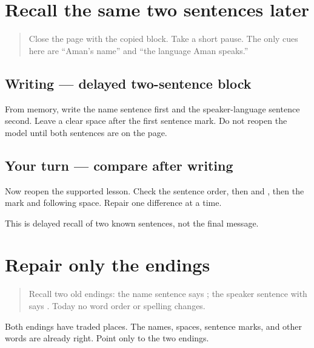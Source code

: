 \section[(delayed name and language pair)]{Recall the same two sentences later}

\label{lesson:PA-W12-two-sentence-delayed}



\begin{quote}
Close the page with the copied block. Take a short pause. The only cues here are “Aman's name” and “the language Aman speaks.”
\end{quote}

\subsection*{Writing — delayed two-sentence block}
From memory, write the name sentence first and the speaker-language sentence second. Leave a clear space after the first sentence mark. Do not reopen the model until both sentences are on the page.

\subsection*{Your turn — compare after writing}
Now reopen the supported lesson. Check the sentence order, then \textbf{} and \textbf{}, then the mark and following space. Repair one difference at a time.

\begin{tcolorbox}[breakable,colback=teal!4,colframe=teal!35!black,title={Before you move on}]
This is delayed recall of two known sentences, not the final message.
\end{tcolorbox}
\section[\texorpdfstring{\pa{ਹੈ} · \pa{ਹਾਂ} (hai · hāṁ)}{ਹੈ · ਹਾਂ (hai · hāṁ)}]{Repair only the endings}

\label{lesson:PA-W12-agreement-repair}



\begin{quote}
Recall two old endings: the name sentence says \textbf{}; the speaker sentence with \textbf{} says \textbf{}. Today no word order or spelling changes.
\end{quote}

\begin{tcolorbox}[breakable,skin=enhanced,colback=orange!6,colframe=orange!45!black,boxrule=0.5pt,arc=1mm,left=6pt,right=6pt,top=4pt,bottom=4pt,fonttitle=\bfseries,title={Read this}]
\begin{quote}
       
\end{quote}

Both endings have traded places. The names, spaces, sentence marks, and other words are already right. Point only to the two endings.
\end{tcolorbox}

